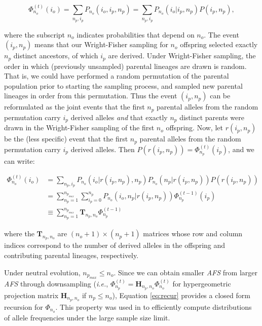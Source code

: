 \documentclass[review]{elsarticle}
\newcommand{\afs}[2]{\Phi_{#1}^{(#2)}}
\begin{document}
\begin{equation}
\afs{n_o}{t}(i_o)=\sum_{n_p,i_p} P_{n_o}(i_o,i_p,n_p) = 
                  \sum_{n_p,i_p} P_{n_o}(i_o|i_p,n_p) P(i_p,n_p),
\end{equation}

where the subscript $n_o$ indicates probabilities that depend on $n_o$. The event $(i_p,n_p)$ means
that our Wright-Fisher sampling for $n_o$ offspring selected exactly $n_p$ distinct ancestors, of
which $i_p$ are derived. Under Wright-Fisher sampling, the order in which (previously unsampled)
parental lineages are drawn is random. That is, we could have performed a random permutation of the
parental population prior to starting the sampling process, and sampled new parental lineages in
order from this permutation. Thus the event $(i_p,n_p)$ can be reformulated as the joint events that
the first $n_p$ parental alleles from the random permutation carry $i_p$ derived alleles
\textit{and} that exactly $n_p$ distinct parents were drawn in the Wright-Fisher sampling of the
first $n_o$ offspring. Now, let $r(i_p,n_p)$ be the (less specific) event that the first $n_p$
parental alleles from the random permutation carry $i_p$ derived alleles. Then
$P(r(i_p,n_p)) =\afs{n_p}{t} (i_p)$, and we can write:

\begin{equation}
\begin{split}
  \afs{n_o}{t}(i_o)
  &=      \sum_{n_p,i_p}                        P_{n_o}(i_o|r(i_p,n_p),n_p) P_{n_o}(n_p|r(i_p,n_p)) P(r(i_p,n_p)) \\
  &=      \sum_{n_p=1}^{n_{p_{max}}} \sum_{i_p=0}^{n_p} P_{n_o}(i_o,n_p|r(i_p,n_p)) \afs{n_p}{t-1}(i_p)  \\
  &\equiv \sum_{n_p=1}^{n_{p_{max}}} \mathbf{T}_{n_p,n_o}                         \afs{n_p}{t-1}
\end{split}
\label{eq:recur}
\end{equation}

where the $\mathbf{T}_{n_p,n_o}$ are $(n_o+1) \times (n_p+1)$ matrices whose row and column indices
correspond to the number of derived alleles in the offspring and contributing parental lineages,
respectively.

Under neutral evolution, $n_{p_{max}}\leq n_o$. Since we can obtain smaller \textit{AFS} from larger
\textit{AFS} through downsampling (\textit{i.e.}, $\afs{n_p}{t} = \mathbf{H}_{n_p,n_o} \afs{n_o}{t}$
for hypergeometric projection matrix $\mathbf{H}_{n_p,n_o}$ if $n_p\leq n_o$), Equation
\eqref{eq:recur} provides a closed form recursion for $\Phi_{n_o}.$ This property was used in
\cite{JouganousEtAl2017} to efficiently compute distributions of allele frequencies under the large
sample size limit.
\end{document}
